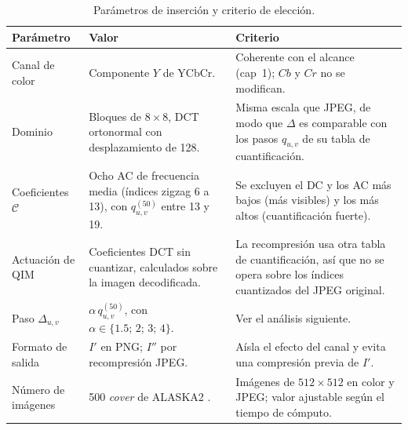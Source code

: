 \documentclass[IB]{TFUOC}%
\begin{document}
\begin{table}[H]
\centering
\scriptsize
\caption{Parámetros de inserción y criterio de elección.}
\label{tab:parametros}
\begin{tabular}{|p{2.6cm}|p{5.0cm}|p{7.4cm}|}
\hline
\rowcolor{uocnavy}
\color{white}\textbf{Parámetro} &
\color{white}\textbf{Valor} &
\color{white}\textbf{Criterio} \\
\hline
Canal de color & Componente $Y$ de YCbCr. & Coherente con el alcance (cap~1); $Cb$ y $Cr$ no se modifican. \\
\hline
Dominio & Bloques de $8\times8$, DCT ortonormal con desplazamiento de 128. & Misma escala que JPEG, de modo que $\Delta$ es comparable con los pasos $q_{u,v}$ de su tabla de cuantificación. \\
\hline
Coeficientes $\mathcal{C}$ & Ocho AC de frecuencia media (índices zigzag 6 a 13), con $q^{(50)}_{u,v}$ entre 13 y 19. & Se excluyen el DC y los AC más bajos (más visibles) y los más altos (cuantificación fuerte). \\
\hline
Actuación de QIM & Coeficientes DCT sin cuantizar, calculados sobre la imagen decodificada. & La recompresión usa otra tabla de cuantificación, así que no se opera sobre los índices cuantizados del JPEG original. \\
\hline
Paso $\Delta_{u,v}$ & $\alpha\,q^{(50)}_{u,v}$, con $\alpha\in\{1{.}5;\,2;\,3;\,4\}$. & Ver el análisis siguiente. \\
\hline
Formato de salida & $I'$ en PNG; $I''$ por recompresión JPEG. & Aísla el efecto del canal y evita una compresión previa de $I'$. \\
\hline
Número de imágenes & 500 \textit{cover} de ALASKA2 \cite{cogranne2020alaska2}. & Imágenes de $512\times512$ en color y JPEG; valor ajustable según el tiempo de cómputo. \\
\hline
\end{tabular}
\end{table}
\end{document}
